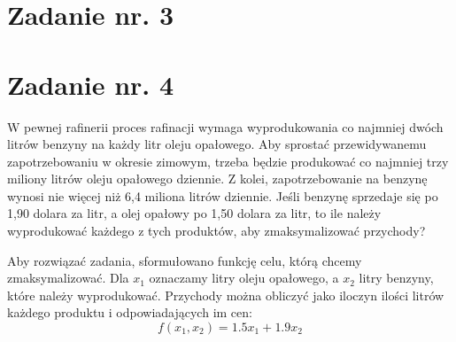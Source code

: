 \documentclass{article}
\begin{document}
\section{Zadanie nr. 3}

\section{Zadanie nr. 4}
W pewnej rafinerii proces rafinacji wymaga wyprodukowania co najmniej dwóch
litrów benzyny na każdy litr oleju opałowego. Aby sprostać przewidywanemu zapotrzebowaniu
w okresie zimowym, trzeba będzie produkować co najmniej trzy miliony litrów oleju
opałowego dziennie. Z kolei, zapotrzebowanie na benzynę wynosi nie więcej niż 6,4 miliona
litrów dziennie. Jeśli benzynę sprzedaje się po 1,90 dolara za litr, a olej opałowy po 1,50 dolara
za litr, to ile należy wyprodukować każdego z tych produktów, aby zmaksymalizować
przychody?
\newline

Aby rozwiązać zadania, sformułowano funkcję celu, którą chcemy zmaksymalizować. Dla $x_1$ oznaczamy litry oleju opałowego, 
a $x_2$ litry benzyny, które należy wyprodukować. Przychody można obliczyć jako iloczyn ilości litrów każdego produktu i odpowiadających im cen:
\begin{equation}
   f(x_1,x_2)=1.5x_1 + 1.9x_2 
\end{equation}
\end{document}
